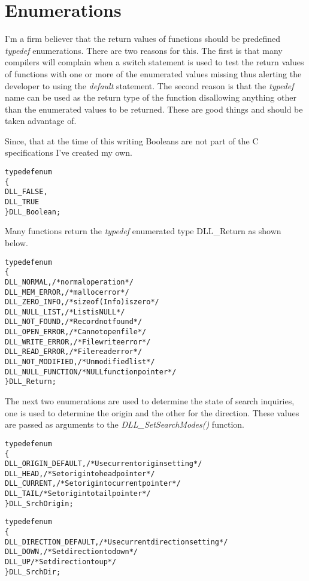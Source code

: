 \documentclass[10pt,letterpaper,titlepage]{article}
\begin{document}
\section{Enumerations}
I'm a firm believer that the return values of functions should be predefined \emph{typedef} enumerations.  There are two reasons for this.  The first is that many compilers will complain when a switch statement is used to test the return values of functions with one or more of the enumerated values missing thus alerting the developer to using the \emph{default} statement.   The second reason is that the \emph{typedef} name can be used as the return type of the function disallowing anything other than the enumerated values to be returned.  These are good things and should be taken advantage of.
\vspace{8pt}

\noindent
Since, that at the time of this writing Booleans are not part of the C specifications I've created my own.

\small
\begin{alltt}
typedef enum
   \{
   DLL_FALSE,
   DLL_TRUE
   \} DLL_Boolean;
\end{alltt}
\normalsize
\vspace{8pt}

\noindent
Many functions return the \emph{typedef} enumerated type DLL\_Return as shown below.

\small
\begin{alltt}
typedef enum
   \{
   DLL_NORMAL,            /* normal operation */
   DLL_MEM_ERROR,         /* malloc error */
   DLL_ZERO_INFO,         /* sizeof(Info) is zero */
   DLL_NULL_LIST,         /* List is NULL */
   DLL_NOT_FOUND,         /* Record not found */
   DLL_OPEN_ERROR,        /* Cannot open file */
   DLL_WRITE_ERROR,       /* File write error */
   DLL_READ_ERROR,        /* File read error */
   DLL_NOT_MODIFIED,      /* Unmodified list */
   DLL_NULL_FUNCTION      /* NULL function pointer */
   \} DLL_Return;
\end{alltt}
\normalsize
\vspace{8pt}

\noindent
The next two enumerations are used to determine the state of search inquiries, one is used to determine the origin and the other for the direction.  These values are passed as arguments to the \emph{DLL\_SetSearchModes()} function.

\small
\begin{alltt}
typedef enum
   \{
   DLL_ORIGIN_DEFAULT,    /* Use current origin setting */
   DLL_HEAD,              /* Set origin to head pointer */
   DLL_CURRENT,           /* Set origin to current pointer */
   DLL_TAIL               /* Set origin to tail pointer */
   \} DLL_SrchOrigin;

typedef enum
   \{
   DLL_DIRECTION_DEFAULT, /* Use current direction setting */
   DLL_DOWN,              /* Set direction to down */
   DLL_UP                 /* Set direction to up */
   \} DLL_SrchDir;
\end{alltt}
\normalsize
\vspace{8pt}
\end{document}

